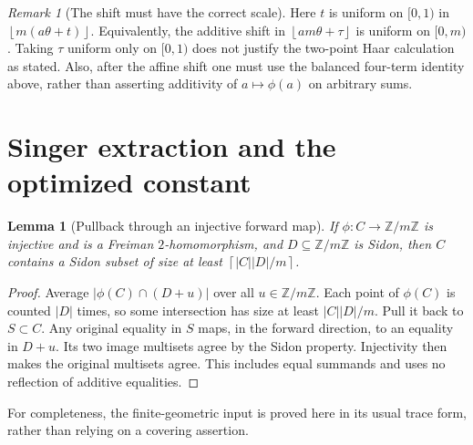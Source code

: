 \documentclass[11pt]{article}
\newtheorem{lemma}[theorem]{Lemma}
\theoremstyle{definition}
\theoremstyle{remark}
\newtheorem{remark}[theorem]{Remark}
\newcommand{\Z}{\mathbb Z}
\newcommand{\ceil}[1]{\left\lceil #1\right\rceil}
\newcommand{\floor}[1]{\left\lfloor #1\right\rfloor}
\begin{document}
\begin{remark}[The shift must have the correct scale]
Here $t$ is uniform on $[0,1)$ in $\floor{m(a\theta+t)}$.
Equivalently, the additive shift in $\floor{am\theta+\tau}$ is uniform
on $[0,m)$. Taking $\tau$ uniform only on $[0,1)$ does not justify the
two-point Haar calculation as stated. Also, after the affine shift one
must use the balanced four-term identity above, rather than asserting
additivity of $a\mapsto\phi(a)$ on arbitrary sums.
\end{remark}

\section{Singer extraction and the optimized constant}

\begin{lemma}[Pullback through an injective forward map]\label{lem:pullback}
If $\phi:C\to\Z/m\Z$ is injective and is a Freiman $2$-homomorphism,
and $D\subseteq\Z/m\Z$ is Sidon, then $C$ contains a Sidon subset of
size at least $\ceil{|C||D|/m}$.
\end{lemma}
\begin{proof}
Average $|\phi(C)\cap(D+u)|$ over all $u\in\Z/m\Z$. Each point of
$\phi(C)$ is counted $|D|$ times, so some intersection has size at least
$|C||D|/m$. Pull it back to $S\subset C$. Any original equality in $S$
maps, in the forward direction, to an equality in $D+u$. Its two image
multisets agree by the Sidon property. Injectivity then makes the
original multisets agree. This includes equal summands and uses no
reflection of additive equalities.
\end{proof}

For completeness, the finite-geometric input is proved here in its
usual trace form, rather than relying on a covering assertion.
\end{document}
